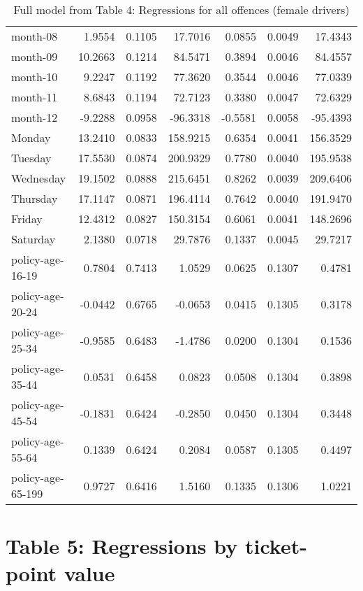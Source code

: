 \documentclass[10pt]{article}
\begin{document}
\begin{table}[ht]
\begin{tabular}{lrrrrrr}
  month-08 & 1.9554 & 0.1105 & 17.7016 & 0.0855 & 0.0049 & 17.4343 \\ 
  month-09 & 10.2663 & 0.1214 & 84.5471 & 0.3894 & 0.0046 & 84.4557 \\ 
  month-10 & 9.2247 & 0.1192 & 77.3620 & 0.3544 & 0.0046 & 77.0339 \\ 
  month-11 & 8.6843 & 0.1194 & 72.7123 & 0.3380 & 0.0047 & 72.6329 \\ 
  month-12 & -9.2288 & 0.0958 & -96.3318 & -0.5581 & 0.0058 & -95.4393 \\ 
  Monday & 13.2410 & 0.0833 & 158.9215 & 0.6354 & 0.0041 & 156.3529 \\ 
  Tuesday & 17.5530 & 0.0874 & 200.9329 & 0.7780 & 0.0040 & 195.9538 \\ 
  Wednesday & 19.1502 & 0.0888 & 215.6451 & 0.8262 & 0.0039 & 209.6406 \\ 
  Thursday & 17.1147 & 0.0871 & 196.4114 & 0.7642 & 0.0040 & 191.9470 \\ 
  Friday & 12.4312 & 0.0827 & 150.3154 & 0.6061 & 0.0041 & 148.2696 \\ 
  Saturday & 2.1380 & 0.0718 & 29.7876 & 0.1337 & 0.0045 & 29.7217 \\ 
  policy-age-16-19 & 0.7804 & 0.7413 & 1.0529 & 0.0625 & 0.1307 & 0.4781 \\ 
  policy-age-20-24 & -0.0442 & 0.6765 & -0.0653 & 0.0415 & 0.1305 & 0.3178 \\ 
  policy-age-25-34 & -0.9585 & 0.6483 & -1.4786 & 0.0200 & 0.1304 & 0.1536 \\ 
  policy-age-35-44 & 0.0531 & 0.6458 & 0.0823 & 0.0508 & 0.1304 & 0.3898 \\ 
  policy-age-45-54 & -0.1831 & 0.6424 & -0.2850 & 0.0450 & 0.1304 & 0.3448 \\ 
  policy-age-55-64 & 0.1339 & 0.6424 & 0.2084 & 0.0587 & 0.1305 & 0.4497 \\ 
  policy-age-65-199 & 0.9727 & 0.6416 & 1.5160 & 0.1335 & 0.1306 & 1.0221 \\ 
   \hline
\end{tabular}
\caption{Full model from Table 4: Regressions for all offences (female drivers)} 
\label{tab_4_all_pts_F}
\end{table}


\clearpage
\pagebreak




\section{Table 5: Regressions by ticket-point value}
\end{document}
